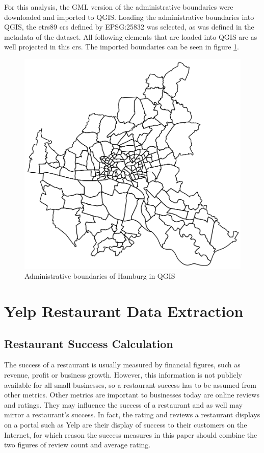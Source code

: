 \documentclass[a4paper, 11pt, oneside]{Thesis}  %
\begin{document}
For this analysis, the GML version of the administrative boundaries were downloaded and imported to QGIS. Loading the administrative boundaries into QGIS, the \ac{etrs89} \ac{crs} defined by EPSG:25832 was selected, as was defined in the metadata of the dataset. All following elements that are loaded into QGIS are as well projected in this \ac{crs}. The imported boundaries can be seen in figure \ref{fig:administrative_boundaries}.

\begin{figure}[h]
\includegraphics[scale=0.5]{Figures/Hamburg_Administrative_Boundaries.png}
\centering
\caption{Administrative boundaries of Hamburg in QGIS}
\label{fig:administrative_boundaries}
\end{figure}


\section{Yelp Restaurant Data Extraction}



\subsection{Restaurant Success Calculation}

The success of a restaurant is usually measured by financial figures, such as revenue, profit or business growth. However, this information is not publicly available for all small businesses, so a restaurant success has to be assumed from other metrics. Other metrics are important to businesses today are online reviews and ratings. They may influence the success of a restaurant and as well may mirror a restaurant's success. In fact, the rating and reviews a restaurant displays on a portal such as Yelp are their display of success to their customers on the Internet, for which reason the success measures in this paper should combine the two figures of review count and average rating.
\end{document}
